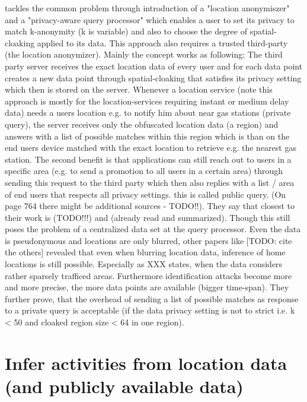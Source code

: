 \parencite{casper} tackles the common problem through introduction of a "location anonymiszer" and a "privacy-aware query processor" which enables a user to set its privacy to match k-anonymity (k is variable) and also to choose the degree of spatial-cloaking applied to its data. This approach also requires a trusted third-party (the location anonymizer). Mainly the concept works as following: The third party server receives the exact location data of every user and for each data point creates a new data point through spatial-cloaking that satisfies its privacy setting which then is stored on the server. Whenever a location service (note this approach is mostly for the location-services requiring instant or medium delay data) needs a users location e.g. to notify him about near gas stations (private query), the server receives only the obfuscated location data (a region) and answers with a list of possible matches within this region which is than on the end users device matched with the exact location to retrieve e.g. the nearest gas station. The second benefit is that applications can still reach out to users in a specific area (e.g. to send a promotion to all users in a certain area) through sending this request to the third party which then also replies with a list / area of end users that respects all privacy settings. this is called public query. (On page 764 there might be additional sources - TODO!!). They say that closest to their work is \parencite{gedik2004customizable} (TODO!!!) and \parencite{gruteser2003anonymous} (already read and summarized). Though this still poses the problem of a centralized data set at the query processor. Even the data is pseudonymous and locations are only blurred, other papers like [TODO: cite the others] revealed that even when blurring location data, inference of home locations is still possible. Especially as XXX states, when the data considers rather sparsely trafficed areas. Furthermore identification attacks become more and more precise, the more data points are available (bigger time-span). They further prove, that the overhead of sending a list of possible matches as response to a private query is acceptable (if the data privacy setting is not to strict i.e. k < 50 and cloaked region size < 64 in one region).

\section{Infer activities from location data (and publicly available data)}

